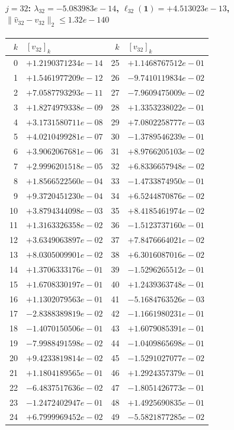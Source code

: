 \documentclass[11pt]{article}
\begin{document}
\paragraph{$j = 32$: $\lambda_{32} = -5.083983e-14$, \quad $\ell_{32}(\mathbf{1}) = +4.513023e-13$, \quad $\|\hat{v}_{32} - v_{32}\|_2 \leq 1.32e-140$}
\begin{center}
{\footnotesize
\begin{tabular}{r@{\;\;}l@{\quad}r@{\;\;}l}
\toprule
$k$ & $[v_{32}]_k$ & $k$ & $[v_{32}]_k$ \\
\midrule
0 & $+1.2190371234e-14$ & 25 & $+1.1468767512e-01$ \\
1 & $+1.5461977209e-12$ & 26 & $-9.7410119834e-02$ \\
2 & $+7.0587793293e-11$ & 27 & $-7.9609475009e-02$ \\
3 & $+1.8274979338e-09$ & 28 & $+1.3353238022e-01$ \\
4 & $+3.1731580711e-08$ & 29 & $+7.0802258777e-03$ \\
5 & $+4.0210499281e-07$ & 30 & $-1.3789546239e-01$ \\
6 & $+3.9062067681e-06$ & 31 & $+8.9766205103e-02$ \\
7 & $+2.9996201518e-05$ & 32 & $+6.8336657948e-02$ \\
8 & $+1.8566522560e-04$ & 33 & $-1.4733874950e-01$ \\
9 & $+9.3720451230e-04$ & 34 & $+6.5244870876e-02$ \\
10 & $+3.8794344098e-03$ & 35 & $+8.4185461974e-02$ \\
11 & $+1.3163326358e-02$ & 36 & $-1.5123737160e-01$ \\
12 & $+3.6349063897e-02$ & 37 & $+7.8476664021e-02$ \\
13 & $+8.0305009901e-02$ & 38 & $+6.3016087016e-02$ \\
14 & $+1.3706333176e-01$ & 39 & $-1.5296265512e-01$ \\
15 & $+1.6708330197e-01$ & 40 & $+1.2439363748e-01$ \\
16 & $+1.1302079563e-01$ & 41 & $-5.1684763526e-03$ \\
17 & $-2.8388389819e-02$ & 42 & $-1.1661980231e-01$ \\
18 & $-1.4070150506e-01$ & 43 & $+1.6079085391e-01$ \\
19 & $-7.9988491598e-02$ & 44 & $-1.0409865698e-01$ \\
20 & $+9.4233819814e-02$ & 45 & $-1.5291027077e-02$ \\
21 & $+1.1804189565e-01$ & 46 & $+1.2924357379e-01$ \\
22 & $-6.4837517636e-02$ & 47 & $-1.8051426773e-01$ \\
23 & $-1.2472402947e-01$ & 48 & $+1.4925690835e-01$ \\
24 & $+6.7999969452e-02$ & 49 & $-5.5821877285e-02$ \\
\bottomrule
\end{tabular}
}
\end{center}
\end{document}
